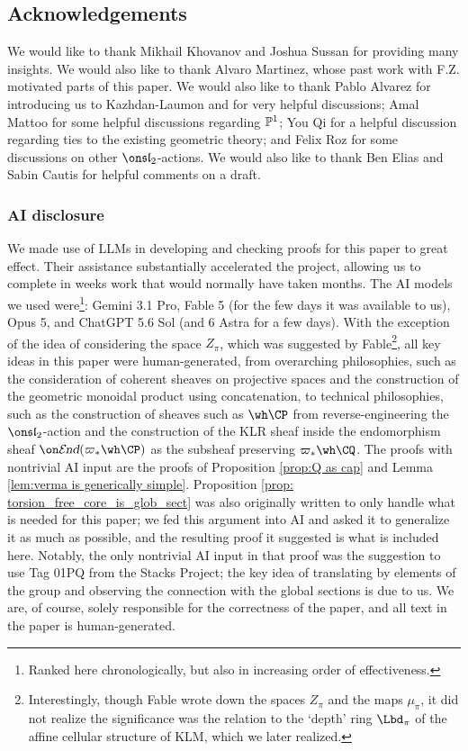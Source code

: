 \documentclass[11pt,reqno]{amsart}
\begin{document}
\subsection{Acknowledgements} 
We would like to thank Mikhail Khovanov and Joshua Sussan for providing many insights. We would also like to thank Alvaro Martinez, whose past work with F.Z. motivated parts of this paper. We would also like to thank Pablo Alvarez for introducing us to Kazhdan-Laumon and for very helpful discussions; Amal Mattoo for some helpful discussions regarding $\mathbb P^1$; You Qi for a helpful discussion regarding ties to the existing geometric theory; and Felix Roz for some discussions on other $\sl_2$-actions. We would also like to thank Ben Elias and Sabin Cautis for helpful comments on a draft.

\subsubsection{AI disclosure}
We made use of LLMs in developing and checking proofs for this paper to great effect. Their assistance substantially accelerated the project, allowing us to complete in weeks work that would normally have taken months. The AI models we used were\footnote{Ranked here chronologically, but also in increasing order of effectiveness.}: Gemini 3.1 Pro, Fable 5 (for the few days it was available to us), Opus 5, and ChatGPT 5.6 Sol (and 6 Astra for a few days). With the exception of the idea of considering the space $Z_\pi$, which was suggested by Fable\footnote{Interestingly, though Fable wrote down the spaces $Z_\pi$ and the maps $\mu_\pi$, it did not realize the significance was the relation to the `depth' ring $\Lbd_\pi$ of the affine cellular structure of KLM, which we later realized.}, all key ideas in this paper were human-generated, from overarching philosophies, such as the consideration of coherent sheaves on projective spaces and the construction of the geometric monoidal product using concatenation, to technical philosophies, such as the construction of sheaves such as $\wh\CP$ from reverse-engineering the $\sl_2$-action and the construction of the KLR sheaf inside the endomorphism sheaf $\shend(\varpi_*\wh\CP)$ as the subsheaf preserving $\varpi_*\wh\CQ$. The proofs with nontrivial AI input are the proofs of Proposition \ref{prop:Q as cap} and Lemma \ref{lem:verma is generically simple}. Proposition \ref{prop: torsion_free_core_is_glob_sect} was also originally written to only handle what is needed for this paper; we fed this argument into AI and asked it to generalize it as much as possible, and the resulting proof it suggested is what is included here. Notably, the only nontrivial AI input in that proof was the suggestion to use Tag 01PQ from the Stacks Project; the key idea of translating by elements of the group and observing the connection with the global sections is due to us. We are, of course, solely responsible for the correctness of the paper, and all text in the paper is human-generated.  
\end{document}
